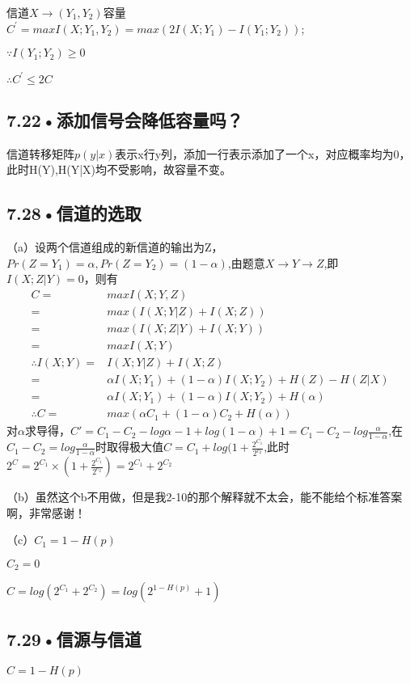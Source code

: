 \documentclass[UTF8]{ctexart}
\begin{document}
信道$X\rightarrow (Y_1,Y_2)$容量$C^\prime = max I(X;Y_1,Y_2)=max (2I(X;Y_1)-I(Y_1;Y_2))$;

$\because I(Y_1;Y_2)\geqslant 0$

$\therefore C^\prime \leqslant 2C$

\subsection*{7.22•添加信号会降低容量吗？}
信道转移矩阵$p(y|x)$表示x行y列，添加一行表示添加了一个x，对应概率均为0，此时H(Y),H(Y|X)均不受影响，故容量不变。
\subsection*{7.28•信道的选取}
（a）设两个信道组成的新信道的输出为Z，$Pr(Z=Y_1)=\alpha,Pr(Z=Y_2)=(1-\alpha)$,由题意$X\rightarrow Y\rightarrow Z$,即$I(X;Z|Y)=0$，则有
\begin{equation*}
    \begin{split}
        C = &max I(X;Y,Z)\\
        = & max(I(X;Y|Z)+I(X;Z))\\
        = & max (I(X;Z|Y)+I(X;Y))\\
        = & maxI(X;Y)\\
        \therefore I(X;Y)=&I(X;Y|Z)+I(X;Z)\\
        =&\alpha I(X;Y_1)+(1-\alpha)I(X;Y_2)+H(Z)-H(Z|X)\\
        =&\alpha I(X;Y_1)+(1-\alpha)I(X;Y_2)+H(\alpha)\\
        \therefore C = &max (\alpha C_1 +(1-\alpha)C_2 +H(\alpha))
    \end{split}
\end{equation*}
对$\alpha$求导得，$C\prime = C_1-C_2 -log\alpha -1 +log (1-\alpha)+1=C_1-C_2-log\frac{\alpha}{1-\alpha}$,在$C_1-C_2=log\frac{\alpha}{1-\alpha}$时取得极大值$C = C_1+log(1+\frac{2^{C_1}}{2^{c_2}}$,此时$2^C=2^{C_1}\times (1+\frac{2^{C_1}}{2^{c_2}})=2^{C_1}+2^{C_2}$

（b）虽然这个b不用做，但是我2-10的那个解释就不太会，能不能给个标准答案啊，非常感谢！

（c）$C_1 = 1-H(p)$

$C_2 = 0$

$C=log(2^{C_1}+2^{C_2})=log(2^{1-H(p)}+1)$
\subsection*{7.29•信源与信道}
$C = 1-H(p)$
\end{document}
